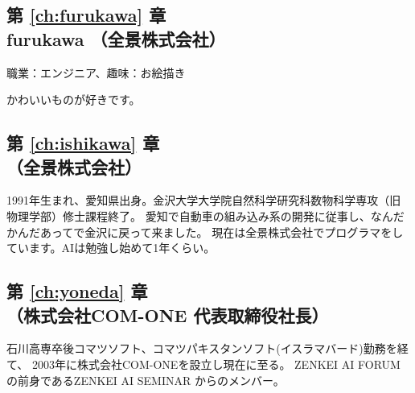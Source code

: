 \documentclass[dvipdfmx,autodetect-engine,10pt,b5paper,papersize,openany,dvipsnames]{jsbook}
\begin{document}
{\subsection*{第 \ref{ch:furukawa} 章\\ furukawa （全景株式会社）}

職業：エンジニア、趣味：お絵描き

かわいいものが好きです。

\subsection*{第 \ref{ch:ishikawa} 章\\ （全景株式会社）}

1991年生まれ、愛知県出身。金沢大学大学院自然科学研究科数物科学専攻（旧 物理学部）修士課程終了。
愛知で自動車の組み込み系の開発に従事し、なんだかんだあってで金沢に戻って来ました。
現在は全景株式会社でプログラマをしています。AIは勉強し始めて1年くらい。


\subsection*{第 \ref{ch:yoneda} 章\\ （株式会社COM-ONE 代表取締役社長）}

石川高専卒後コマツソフト、コマツパキスタンソフト(イスラマバード)勤務を経て、
2003年に株式会社COM-ONEを設立し現在に至る。
ZENKEI AI FORUM の前身であるZENKEI AI SEMINAR からのメンバー。
}

\newpage
\end{document}
